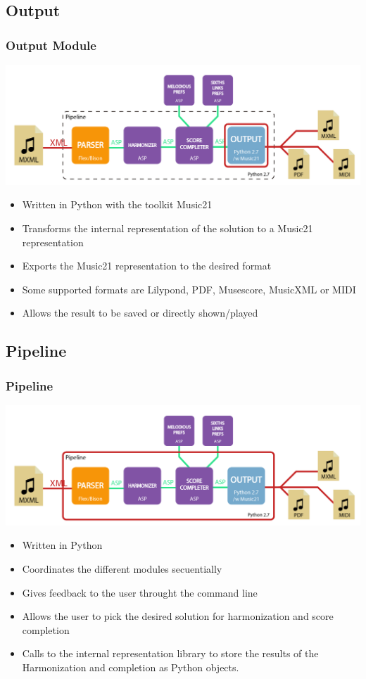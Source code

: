 \documentclass[english]{beamer}
\begin{document}
\subsection{Output}
		\begin{frame}[t]
		\frametitle{Output Module}
		\begin{center}
				\includegraphics[width=0.6\linewidth]{imagenes/arch_trans/arquitectura_final_out-01.png}
				\end{center}
			\begin{itemize}
				\item Written in Python with the toolkit Music21
				\item Transforms the internal representation of the solution to a Music21 representation
				\item Exports the Music21 representation to the desired format
				\item Some supported formats are Lilypond, PDF, Musescore, MusicXML or MIDI
				\item Allows the result to be saved or directly shown/played
			\end{itemize}
		\end{frame}
\subsection{Pipeline}
	\begin{frame}[t]
	\frametitle{Pipeline}
	\begin{center}
			\includegraphics[width=0.6\linewidth]{imagenes/arch_trans/arquitectura_final_pipe-01.png}
			\end{center}
		\begin{itemize}
			\item Written in Python
			\item Coordinates the different modules secuentially
			\item Gives feedback to the user throught the command line
			\item Allows the user to pick the desired solution for harmonization and score completion
			\item Calls to the internal representation library to store the results of the Harmonization and completion as Python objects.
		\end{itemize}
	\end{frame}
\end{document}
